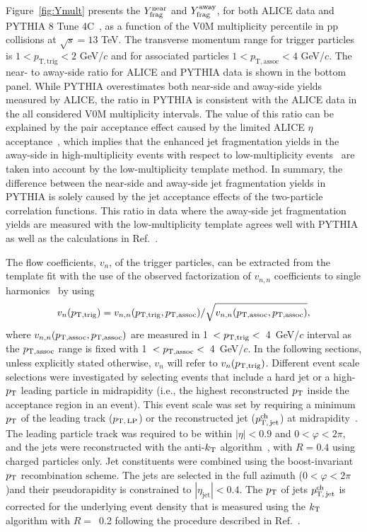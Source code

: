 Figure~\ref{fig:Ymult} presents the $Y^{\mathrm{near}}_{\rm{frag}}$ and $Y^{\mathrm{away}}_{\rm{frag}}$, for both ALICE data and PYTHIA 8 Tune 4C~\cite{Skands:2014pea}, as a function of the V0M multiplicity percentile in pp collisions at $\sqrt{s}=13$ TeV. The transverse momentum range for trigger particles is $1<p_\mathrm{T,trig}<2$ GeV/$c$ and for associated particles $1<p_\mathrm{T,assoc}<4$ GeV/$c$.
The near- to away-side ratio for ALICE and PYTHIA data is shown in the bottom panel. While PYTHIA overestimates both near-side and away-side yields measured by ALICE, the ratio in PYTHIA is consistent with the ALICE data in the all considered V0M multiplicity intervals. The value of this ratio can be explained by the pair acceptance effect caused by the limited ALICE $\eta$ acceptance~\cite{PHENIX:2006gto}, which implies that the enhanced jet fragmentation yields in the away-side in high-multiplicity events with respect to low-multiplicity events~\cite{ALICE:2013tla,ALICE:2014mas} are taken into account by the low-multiplicity template method. In summary, the difference between the near-side and away-side jet fragmentation yields in PYTHIA is solely caused by the jet acceptance effects of the two-particle correlation functions. This ratio in data where the away-side jet fragmentation yields are measured with the low-multiplicity template agrees well with PYTHIA as well as the calculations in Ref.~\cite{PHENIX:2006gto}.

The flow coefficients, $v_{n}$, of the trigger particles, can be extracted from the template fit with the use of the observed factorization of $v_{n,n}$ coefficients to single harmonics~\cite{ATLAS:2015hzw,ATLAS:2016yzd} by using
\begin{eqnarray}
v_{n}(p_{\rm{T,trig}}) = v_{n,n}(p_{\rm{T,trig}}, p_{\rm{T,assoc}}) / \sqrt{ v_{n,n}(p_{\rm{T,assoc}},p_{\rm{T,assoc}})},
\end{eqnarray}
where $v_{n,n}(p_{\rm{T,assoc}}, p_{\rm{T,assoc}})$ are measured in 1~$<p_{\rm{T,trig}}<$~4~GeV/$c$ interval as the $p_{\rm{T,assoc}}$ range is fixed with 1~$<p_{\rm{T,assoc}}<$~4~GeV/$c$. In the following sections, unless explicitly stated otherwise, $v_n$ will refer to $v_n(p_{\rm{T,trig}})$.
Different event scale selections were investigated by selecting events that include a hard jet or a high-$p_\mathrm{T}$ leading particle in midrapidity (i.e., the highest reconstructed $p_\mathrm{T}$ inside the acceptance region in an event).
This event scale was set by requiring a minimum $p_\mathrm{T}$ of the leading track ($p_\mathrm{T,\,LP}$) or the reconstructed jet ($p_\mathrm{T,\,jet}^\mathrm{ch}$) at midrapidity~\cite{ALICE:2021nir}. The leading particle track was required to be within $|\eta|<0.9$ and $0<\varphi<2\pi$, and the jets were reconstructed with the anti-$k_{\rm{T}}$ algorithm~\cite{Cacciari:2008gp,Cacciari:2011ma}, with $R=0.4$ using charged particles only. Jet constituents were combined using the boost-invariant $p_\mathrm{T}$ recombination scheme. The jets are selected in the full azimuth ($0<\varphi<2\pi$)and their pseudorapidity is constrained to $|\eta_\mathrm{jet}|<0.4$. The $p_\mathrm{T}$ of jets $p_\mathrm{T,\,jet}^\mathrm{ch}$ is corrected for the underlying event density that is measured using the $k_{\rm{T}}$ algorithm with $R=$~0.2 following the procedure described in Ref.~\cite{Acharya:2018eat}.

